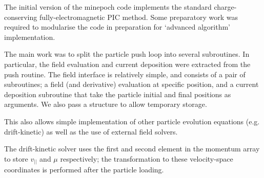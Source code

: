 \documentclass{article}
\begin{document}
The initial version of the minepoch code implements the standard charge-conserving fully-electromagnetic PIC method. Some preparatory work was required to modularise the code in preparation for `advanced algorithm' implementation.

The main work was to  split the particle push loop into several subroutines. In particular, the field evaluation and current deposition were extracted from the push routine. The field interface is relatively simple, and consists of a pair of subroutines; a field (and derivative) evaluation at specific position, and a current deposition subroutine that take the particle initial and final positions as arguments. We also pass a structure
to allow temporary storage.

This also allows simple implementation of other particle evolution equations (e.g. drift-kinetic) as well as the use of external field solvers.

The drift-kinetic solver uses the first and second element in the momentum array to store $v_{||}$ and $\mu$ respectively; the transformation to these velocity-space coordinates is performed after the particle loading. 


\end{document}

